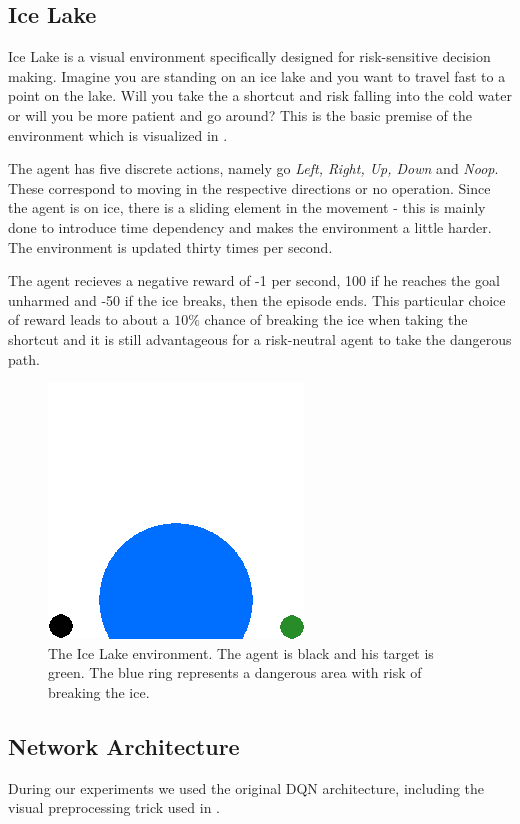 \subsection{Ice Lake}
Ice Lake is a visual environment specifically designed for risk-sensitive decision making. Imagine you are standing on an ice lake and you want to travel fast to a point on the lake. Will you take the a shortcut and risk falling into the cold water or will you be more patient and go around? This is the basic premise of the environment which is visualized in .

The agent has five discrete actions, namely go \textit{Left, Right, Up, Down} and \textit{Noop}. These correspond to moving in the respective directions or no operation. Since the agent is on ice, there is a sliding element in the movement - this is mainly done to introduce time dependency and makes the environment a little harder. The environment is updated thirty times per second.

The agent recieves a negative reward of -1 per second, 100 if he reaches the goal unharmed and -50 if the ice breaks, then the episode ends. This particular choice of reward leads to about a $10\%$ chance of breaking the ice when taking the shortcut and it is still advantageous for a risk-neutral agent to take the dangerous path.

\begin{figure}[h]
\center
\includegraphics[width=0.3\linewidth]{gfx/icelake_start.png}
\caption{The Ice Lake environment. The agent is black and his target is green. The blue ring represents a dangerous area with risk of breaking the ice. }
\label{fig:icelake}
\end{figure}

\subsection{Network Architecture}
During our experiments we used the original DQN architecture, including the visual preprocessing trick used in \citet{mnih2015human}.

